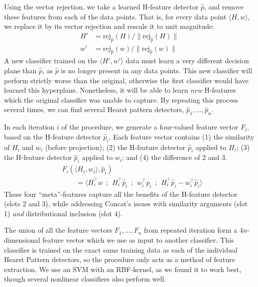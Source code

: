 \documentclass[12pt]{article}
\begin{document}
Using the vector rejection, we take a learned H-feature detector $\hat p$,
and remove these features from each of the data points. That is, for every data
point $\langle H, w\rangle$, we replace it by its vector rejection and rescale
it to unit magnitude:
\begin{align*}
  H' & = \text{rej}_{\hat p}(H) / \|\text{rej}_{\hat p}(H)\|\\
  w' & = \text{rej}_{\hat p}(w) / \|\text{rej}_{\hat p}(w)\|
\end{align*}
A new classifier trained on the $\langle H', w'\rangle$ data must learn
a very different decision plane than $\hat p$, as $\hat p$ is no longer present
in any data points. This new classifier will perform strictly worse than the
original, otherwise the first classifier would have learned this hyperplane.
Nonetheless, it will be able to learn {\em new} H-features which the
original classifier was unable to capture. By repeating this process several
times, we can find several Hearst pattern detectors, $\hat p_1, \ldots, \hat
p_n$.

In each iteration $i$ of the procedure, we generate a four-valued feature vector
$F_i$, based on the H-feature detector $\hat p_i$. Each
feature vector contains (1) the similarity of $H_i$ and $w_i$ (before projection);
(2) the H-feature detector
$\hat p_i$ applied to $H_i$; (3) the H-feature detector $\hat p_i$ applied to $w_i$; and
(4) the difference of 2 and 3.
\begin{align*}
  & F_i(\langle H_i, w_i\rangle, \hat p_i)\\
  & \qquad = \langle H_i^{\top}w~~;~~H_i^\top\hat p_i~~;~~w_i^\top\hat p_i~~;~~H_i^\top\hat p_i - w_i^\top\hat p_i\rangle
\end{align*}
These four ``meta''-features capture all the benefits of the H-feature
detector (slots 2 and 3), while addressing Concat's issues with
similarity arguments (slot 1) {\em and} distributional inclusion (slot 4).

The union of all the feature vectors $F_1, \ldots, F_n$ from repeated iteration form a
$4n$-dimensional feature vector which we use as input to another classifier.
This classifier is trained on the exact same training data as each of the
individual Hearst Pattern detectors, so the procedure only acts as a method of
feature extraction. We use an SVM with an RBF-kernel, as we found it to work
best, though several nonlinear classifiers also perform well.
\end{document}
